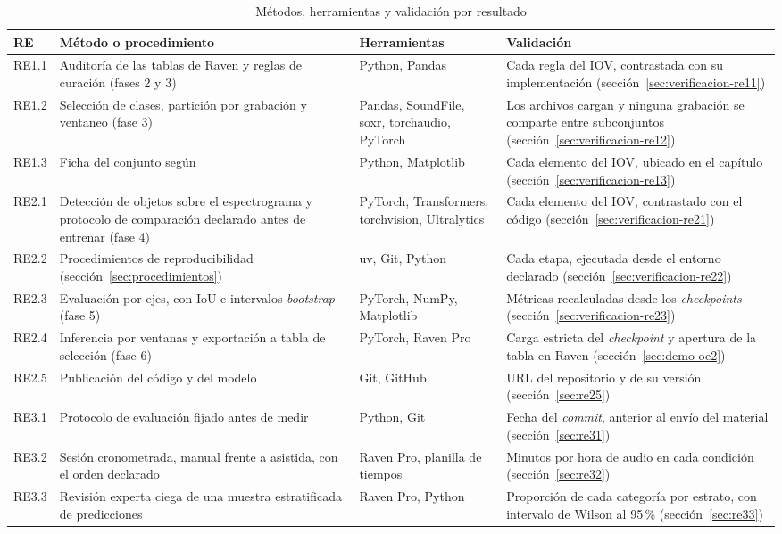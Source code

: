\begin{table}[htbp]
    \centering
    \caption{Métodos, herramientas y validación por resultado}
    \label{tab:metodos-resultados}
    \small
    \begin{tabular}{@{}L{1.0cm}L{4.9cm}L{3.3cm}L{5.0cm}@{}}
        \toprule
        \textbf{RE} & \textbf{Método o procedimiento} & \textbf{Herramientas} & \textbf{Validación} \\
        \midrule
        RE1.1 & Auditoría de las tablas de Raven y reglas de curación (fases 2 y 3) & Python, Pandas & Cada regla del IOV, contrastada con su implementación (sección~\ref{sec:verificacion-re11}) \\
        RE1.2 & Selección de clases, partición por grabación y ventaneo (fase 3) & Pandas, SoundFile, soxr, torchaudio, PyTorch & Los archivos cargan y ninguna grabación se comparte entre subconjuntos (sección~\ref{sec:verificacion-re12}) \\
        RE1.3 & Ficha del conjunto según \citet{gebru_2021} & Python, Matplotlib & Cada elemento del IOV, ubicado en el capítulo (sección~\ref{sec:verificacion-re13}) \\
        \addlinespace
        RE2.1 & Detección de objetos sobre el espectrograma y protocolo de comparación declarado antes de entrenar (fase 4) & PyTorch, Transformers, torchvision, Ultralytics & Cada elemento del IOV, contrastado con el código (sección~\ref{sec:verificacion-re21}) \\
        RE2.2 & Procedimientos de reproducibilidad (sección~\ref{sec:procedimientos}) & uv, Git, Python & Cada etapa, ejecutada desde el entorno declarado (sección~\ref{sec:verificacion-re22}) \\
        RE2.3 & Evaluación por ejes, con IoU \pMatchIou{} e intervalos \textit{bootstrap} (fase 5) & PyTorch, NumPy, Matplotlib & Métricas recalculadas desde los \textit{checkpoints} (sección~\ref{sec:verificacion-re23}) \\
        RE2.4 & Inferencia por ventanas y exportación a tabla de selección (fase 6) & PyTorch, Raven Pro & Carga estricta del \textit{checkpoint} y apertura de la tabla en Raven (sección~\ref{sec:demo-oe2}) \\
        RE2.5 & Publicación del código y del modelo & Git, GitHub & URL del repositorio y de su versión (sección~\ref{sec:re25}) \\
        \addlinespace
        RE3.1 & Protocolo de evaluación fijado antes de medir & Python, Git & Fecha del \textit{commit}, anterior al envío del material (sección~\ref{sec:re31}) \\
        RE3.2 & Sesión cronometrada, manual frente a asistida, con el orden declarado & Raven Pro, planilla de tiempos & Minutos por hora de audio en cada condición (sección~\ref{sec:re32}) \\
        RE3.3 & Revisión experta ciega de una muestra estratificada de predicciones & Raven Pro, Python & Proporción de cada categoría por estrato, con intervalo de Wilson al 95\,\% (sección~\ref{sec:re33}) \\
        \bottomrule
    \end{tabular}
\end{table}

